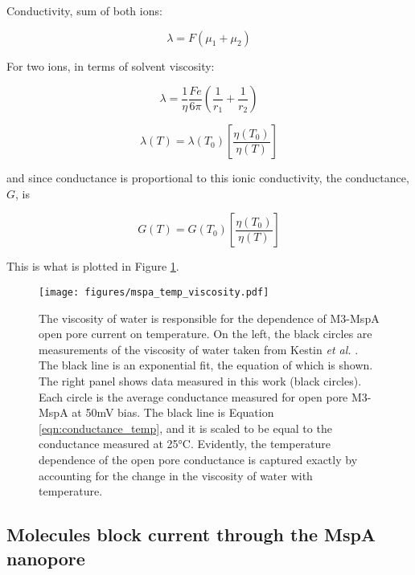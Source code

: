 Conductivity, sum of both ions:

\begin{equation}
\lambda = F(\mu_1 + \mu_2)
\label{eqn:conductivity}
\end{equation}

For two ions, in terms of solvent viscosity:

\begin{equation}
\lambda = \frac{1}{\eta} \frac{Fe}{6\pi} \left( \frac{1}{r_1}+\frac{1}{r_2} \right)
\label{eqn:conductivity_eta}
\end{equation}

\begin{equation}
\lambda(T) = \lambda(T_0) \left[ \frac{\eta(T_0)}{\eta(T)} \right]
\label{eqn:conductivity_temp}
\end{equation}

and since conductance is proportional to this ionic conductivity, the conductance, $G$, is

\begin{equation}
G(T) = G(T_0) \left[ \frac{\eta(T_0)}{\eta(T)} \right]
\label{eqn:conductance_temp}
\end{equation}

This is what is plotted in Figure \ref{fig:mspa_current_temp_viscosity}.

\begin{figure}[h]
\begin{centering}
\texttt{[image: figures/mspa\_temp\_viscosity.pdf]}
\caption[MspA current versus temperature explained by viscosity]{The viscosity of water is responsible for the dependence of M3-MspA open pore current on temperature.  On the left, the black circles are measurements of the viscosity of water taken from Kestin \textit{et al.} \cite{Kestin1978}.  The black line is an exponential fit, the equation of which is shown.  The right panel shows data measured in this work (black circles).  Each circle is the average conductance measured for open pore M3-MspA at 50mV bias.  The black line is Equation \ref{eqn:conductance_temp}, and it is scaled to be equal to the conductance measured at 25°C.  Evidently, the temperature dependence of the open pore conductance is captured exactly by accounting for the change in the viscosity of water with temperature.}
\label{fig:mspa_current_temp_viscosity}
\end{centering}
\end{figure}

\subsection{Molecules block current through the MspA nanopore}

